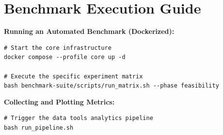 \chapter{Benchmark Execution Guide}
\label{app:benchmark_guide}
\textbf{Running an Automated Benchmark (Dockerized):}
\begin{verbatim}
# Start the core infrastructure
docker compose --profile core up -d

# Execute the specific experiment matrix
bash benchmark-suite/scripts/run_matrix.sh --phase feasibility
\end{verbatim}

\textbf{Collecting and Plotting Metrics:}
\begin{verbatim}
# Trigger the data tools analytics pipeline
bash run_pipeline.sh
\end{verbatim}